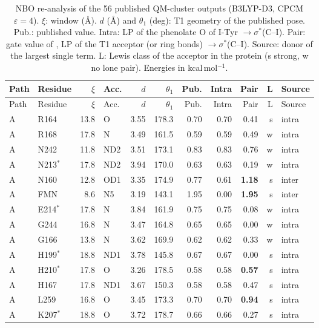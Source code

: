{\footnotesize\setlength{\tabcolsep}{3pt}
\begin{longtable}{llrlrrrrrrl}
\caption{NBO re-analysis of the 56 published QM-cluster outputs (B3LYP-D3, CPCM $\varepsilon=4$). $\xi$: window (\AA). $d$ (\AA) and $\theta_1$ (deg): T1 geometry of the published pose. Pub.: published value. Intra: LP of the phenolate O of I-Tyr $\to\sigma^*$(C--I). Pair: gate value of \BX{}, LP of the T1 acceptor (or ring bonds) $\to\sigma^*$(C--I). Source: donor of the largest single term. L: Lewis class of the acceptor in the protein (s strong, w no lone pair). Energies in kcal\,mol$^{-1}$.}\label{tab:hiydnbo}\\
\toprule
Path & Residue & $\xi$ & Acc. & $d$ & $\theta_1$ & Pub. & Intra & Pair & L & Source \\
\midrule
\endfirsthead
\toprule
Path & Residue & $\xi$ & Acc. & $d$ & $\theta_1$ & Pub. & Intra & Pair & L & Source \\
\midrule
\endhead
\bottomrule
\endfoot
A & R164 & 13.8 & O & 3.55 & 178.3 & 0.70 & 0.70 & 0.41 & s & intra \\
A & R168 & 17.8 & N & 3.49 & 161.5 & 0.59 & 0.59 & 0.49 & w & intra \\
A & N242 & 11.8 & ND2 & 3.51 & 173.1 & 0.83 & 0.83 & 0.76 & w & intra \\
A & N213$^{*}$ & 17.8 & ND2 & 3.94 & 170.0 & 0.63 & 0.63 & 0.19 & w & intra \\
A & N160 & 12.8 & OD1 & 3.35 & 174.9 & 0.77 & 0.61 & \textbf{1.18} & s & inter \\
A & FMN & 8.6 & N5 & 3.19 & 143.1 & 1.95 & 0.00 & \textbf{1.95} & s & inter \\
A & E214$^{*}$ & 17.8 & N & 3.84 & 161.9 & 0.75 & 0.75 & 0.08 & w & intra \\
A & G244 & 16.8 & N & 3.47 & 164.8 & 0.65 & 0.65 & 0.00 & w & intra \\
A & G166 & 13.8 & N & 3.62 & 169.9 & 0.62 & 0.62 & 0.33 & w & intra \\
A & H199$^{*}$ & 18.8 & ND1 & 3.78 & 145.8 & 0.67 & 0.67 & 0.00 & s & intra \\
A & H210$^{*}$ & 17.8 & O & 3.26 & 178.5 & 0.58 & 0.58 & \textbf{0.57} & s & intra \\
A & H167 & 17.8 & ND1 & 3.67 & 150.3 & 0.58 & 0.58 & 0.47 & s & intra \\
A & L259 & 16.8 & O & 3.45 & 173.3 & 0.70 & 0.70 & \textbf{0.94} & s & intra \\
A & K207$^{*}$ & 18.8 & O & 3.72 & 178.7 & 0.66 & 0.66 & 0.27 & s & intra \\

\end{longtable}}
